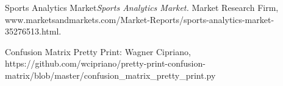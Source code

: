 \documentclass[11pt, a4paper, BCOR=10mm, english]{scrbook}
\begin{document}
    \pagestyle{empty} %
    \hypersetup{pageanchor=false}
    
    \pagestyle{plain} %
    \frontmatter  %

    
    \tableofcontents
    \listoffigures
    \listoftables
    \hypersetup{pageanchor=true}  %

    \setlength{\parindent}{10ex}
    \mainmatter  %
    
    
    
    
    
    




    \begin{thebibliography}{1}

         Sports Analytics Market{\em Sports Analytics Market.} Market Research Firm, www.marketsandmarkets.com/Market-Reports/sports-analytics-market-35276513.html.

         Confusion Matrix Pretty Print: Wagner Cipriano, https://github.com/wcipriano/pretty-print-confusion-matrix/blob/master/confusion_matrix_pretty_print.py

        \end{thebibliography}
\end{document}
